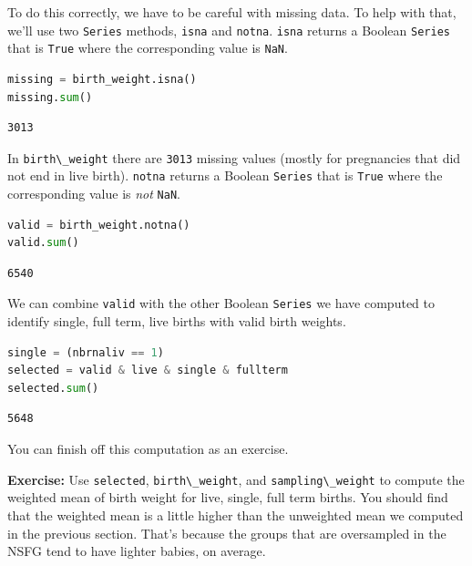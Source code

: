To do this correctly, we have to be careful with missing data. To help
with that, we'll use two \passthrough{\lstinline!Series!} methods,
\passthrough{\lstinline!isna!} and \passthrough{\lstinline!notna!}.
\passthrough{\lstinline!isna!} returns a Boolean
\passthrough{\lstinline!Series!} that is \passthrough{\lstinline!True!}
where the corresponding value is \passthrough{\lstinline!NaN!}.

\begin{lstlisting}[language=Python,style=source]
missing = birth_weight.isna()
missing.sum()
\end{lstlisting}

\begin{lstlisting}[style=output]
3013
\end{lstlisting}

In \passthrough{\lstinline!birth\_weight!} there are
\passthrough{\lstinline!3013!} missing values (mostly for pregnancies
that did not end in live birth). \passthrough{\lstinline!notna!} returns
a Boolean \passthrough{\lstinline!Series!} that is
\passthrough{\lstinline!True!} where the corresponding value is
\emph{not} \passthrough{\lstinline!NaN!}.

\begin{lstlisting}[language=Python,style=source]
valid = birth_weight.notna()
valid.sum()
\end{lstlisting}

\begin{lstlisting}[style=output]
6540
\end{lstlisting}

We can combine \passthrough{\lstinline!valid!} with the other Boolean
\passthrough{\lstinline!Series!} we have computed to identify single,
full term, live births with valid birth weights.

\begin{lstlisting}[language=Python,style=source]
single = (nbrnaliv == 1)
selected = valid & live & single & fullterm
selected.sum()
\end{lstlisting}

\begin{lstlisting}[style=output]
5648
\end{lstlisting}

You can finish off this computation as an exercise.

\textbf{Exercise:} Use \passthrough{\lstinline!selected!},
\passthrough{\lstinline!birth\_weight!}, and
\passthrough{\lstinline!sampling\_weight!} to compute the weighted mean
of birth weight for live, single, full term births. You should find that
the weighted mean is a little higher than the unweighted mean we
computed in the previous section. That's because the groups that are
oversampled in the NSFG tend to have lighter babies, on average.

